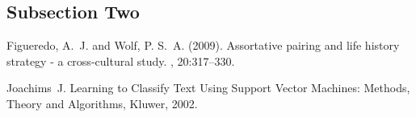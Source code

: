 \documentclass[a4paper]{article}
\theoremstyle{definition}
\begin{document}
\lipsum[7] %

\subsection{Subsection Two}

\lipsum[8] %


\begin{thebibliography}{99} %

Figueredo, A.~J. and Wolf, P. S.~A. (2009).
\newblock Assortative pairing and life history strategy - a cross-cultural study. , 20:317--330.

Joachims~J. Learning to Classify Text Using Support Vector Machines: Methods, Theory and Algorithms, Kluwer, 2002.

\end{thebibliography}

\end{document}
